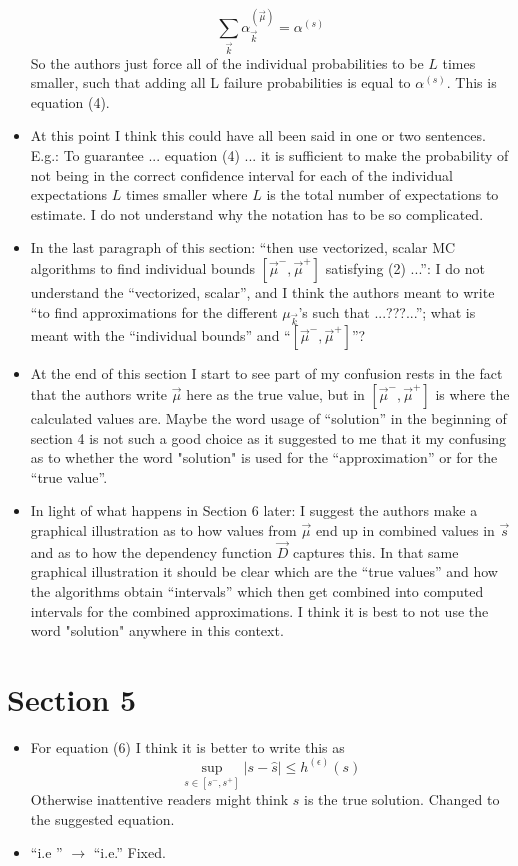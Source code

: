 \documentclass{article}[12pt]
\newcommand{\RefereeTODO}[1]{{\color{red} #1 \newline}}
\newcommand{\Referee}[1]{{\color{blue} #1 \newline}}
\begin{document}
\begin{itemize}
{    $$\sum_{\vec{k}} \alpha_{\vec{k}}^{(\vec{\mu})} = \alpha^{(s)}$$
    So the authors just force all of the individual probabilities to be $L$ times smaller, such that adding all L failure probabilities is equal to $\alpha^{(s)}$. This is equation (4).}
    \item \RefereeTODO{At this point I think this could have all been said in one or two sentences. E.g.: To guarantee ... equation (4) ... it is sufficient to make the probability of not being in the correct confidence interval for each of the individual expectations $L$ times smaller where $L$ is the total number of expectations to estimate. I do not understand why the notation has to be so complicated.}
    \item \RefereeTODO{In the last paragraph of this section: ``then use vectorized, scalar MC algorithms to find individual bounds $[\vec{\mu}^-, \vec{\mu}^+]$ satisfying (2) ...'': I do not understand the ``vectorized, scalar'', and I think the authors meant to write ``to find approximations for the different $\mu_{\vec{k}}$'s such that ...???...''; what is meant with the ``individual bounds'' and ``$[\vec{\mu}^-, \vec{\mu}^+]$''?}
    \item \RefereeTODO{At the end of this section I start to see part of my confusion rests in the fact that the authors write $\vec{\mu}$ here as the true value, but in $[\vec{\mu}^-, \vec{\mu}^+]$ is where the calculated values are. Maybe the word usage of ``solution'' in the beginning of section 4 is not such a good choice as it suggested to me that it my confusing as to whether the word "solution" is used for the ``approximation'' or for the ``true value''.} 
    \item \RefereeTODO{In light of what happens in Section 6 later: I suggest the authors make a graphical illustration as to how values from $\vec{\mu}$ end up in combined values in $\vec{s}$ and as to how the dependency function $\vec{D}$ captures this. In that same graphical illustration it should be clear which are the ``true values'' and how the algorithms obtain ``intervals'' which then get combined into computed intervals for the combined approximations. I think it is best to not use the word "solution" anywhere in this context.}
\end{itemize}

\section*{Section 5}

\begin{itemize}
    \item \Referee{For equation (6) I think it is better to write this as
    $$\sup_{s \in [s^-, s^+]} |s - \hat{s}| \le h^{(\epsilon)}(s)$$
  Otherwise inattentive readers might think $s$ is the true solution.}Changed to the suggested equation. 
  \item \Referee{``i.e '' $\to$ ``i.e.''}Fixed.
\end{itemize}
\end{document}
